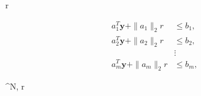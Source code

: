 \documentclass{article}
\begin{document}
 r

\begin{align*}
a_1^T \mathbf{y} + \|a_1\|_2 r &\leq b_1, \\
a_2^T \mathbf{y} + \|a_2\|_2 r &\leq b_2, \\
&\vdots \\
a_m^T \mathbf{y} + \|a_m\|_2 r &\leq b_m,
\end{align*}

 \in {}^N, \quad r 
\end{document}
